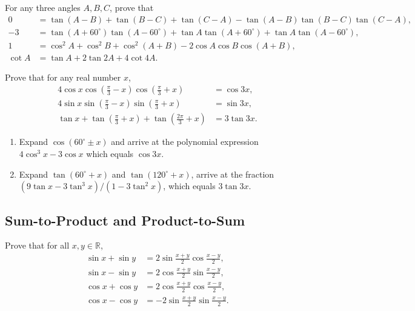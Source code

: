 \begin{question}
    For any three angles $A,B,C$, prove that
    \begin{align*}
        0  &= \tan(A-B)+\tan(B-C)+\tan(C-A)-\tan(A-B)\tan(B-C)\tan(C-A),\\
        -3 &= \tan(A+60^{\circ})\tan(A-60^{\circ}) + \tan A \tan(A+60^{\circ}) + \tan A \tan(A-60^{\circ}),\\
        1  &= \cos^2 A + \cos^2 B + \cos^2 (A+B) - 2 \cos A \cos B \cos(A+B),\\
        \cot A &=\tan A + 2\tan 2A + 4 \cot 4A.
    \end{align*}
\end{question}


    \begin{question}
        Prove that for any real number $x$,
        \begin{align*}
            4\cos x \cos\left(\frac{\pi}{3}-x\right)\cos\left(\frac{\pi}{3}+x\right) &= \cos 3x,\\
            4\sin x \sin\left(\frac{\pi}{3}-x\right)\sin\left(\frac{\pi}{3}+x\right) &= \sin 3x,\\
            \tan x + \tan\left(\frac{\pi}{3}+x\right)+ \tan\left(\frac{2\pi}{3}+x\right) &= 3 \tan 3x.
        \end{align*}
    \end{question}

\begin{solution}
    \begin{enumerate}
        \item Expand $\cos(60^\circ \pm x)$ and arrive at the polynomial expression $4\cos^3 x - 3\cos x$ which equals $\cos 3x$. 
        \item Expand $\tan(60^\circ + x)$ and $\tan(120^\circ + x)$, arrive at the fraction $(9\tan x - 3\tan^3 x)/(1-3\tan^2 x)$, which equals $3\tan 3x$.
    \end{enumerate}
\end{solution}


\subsection{Sum-to-Product and Product-to-Sum}


\begin{tcolorbox}
    \begin{question}[name=Sine and Cosine Sum-to-Product]
    Prove that for all $x,y\in \mathbb R$,
    \begin{align}
        \sin x + \sin y &= 2 \sin \frac{x+y}{2} \cos \frac{x-y}{2}, \label{id:sin-sum-to-product} \\
        \sin x - \sin y &= 2 \cos \frac{x+y}{2} \sin \frac{x-y}{2}, \label{id:sin-difference-to-product} \\
        \cos x + \cos y &= 2 \cos \frac{x+y}{2} \cos \frac{x-y}{2}, \label{id:cos-sum-to-product} \\
        \cos x - \cos y &= -2 \sin \frac{x+y}{2} \sin \frac{x-y}{2}. \label{id:cos-difference-to-product} 
    \end{align}
\end{question}
\end{tcolorbox}

